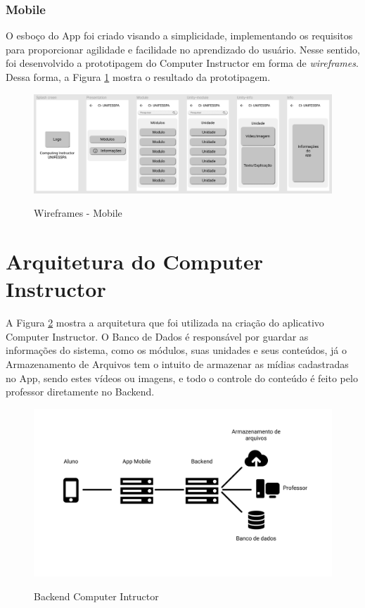 \begin{itemize}
\end{itemize}

\subsubsection{Mobile}
\label{prototipagem_mobile}

O esboço do App foi criado visando a simplicidade, implementando os requisitos para proporcionar agilidade e facilidade no aprendizado do usuário. Nesse sentido, foi desenvolvido a prototipagem do Computer Instructor em forma de \textit{wireframes}. Dessa forma, a Figura \ref{fig:wireframe_mobile} mostra o resultado da prototipagem.

\begin{figure}[H]
    \centering
    \caption{Wireframes - Mobile}
    \includegraphics[width=1\textwidth]{figuras/Wireframe mobile.png}
    \label{fig:wireframe_mobile}
    {}
\end{figure}

\section{Arquitetura do  Computer Instructor}
\label{arquitetura}

A Figura \ref{fig:arquitetura_backend} mostra a arquitetura que foi utilizada na criação do aplicativo  Computer Instructor. O Banco de Dados é responsável por guardar as informações do sistema, como os módulos, suas unidades e seus conteúdos, já o Armazenamento de Arquivos tem o intuito de armazenar as mídias cadastradas no App, sendo estes vídeos ou imagens, e todo o controle do conteúdo é feito pelo professor diretamente no Backend.

\begin{figure}[H]
    \centering
    \caption{Backend Computer Intructor}
    \includegraphics[width=1\textwidth]{figuras/Arquitetura - Computer Instructor.png}
    \label{fig:arquitetura_backend}
    {}
\end{figure}

